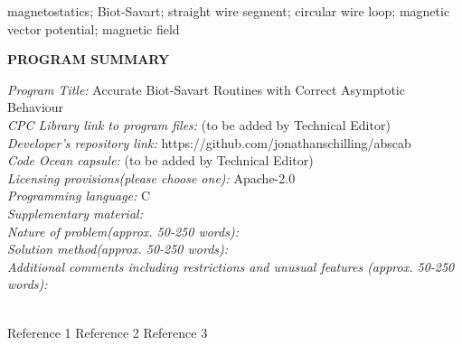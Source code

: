 \documentclass[preprint,12pt]{elsarticle}
\begin{document}
\begin{frontmatter}
\begin{keyword}
magnetostatics; Biot-Savart; straight wire segment; circular wire loop; magnetic vector potential; magnetic field
\end{keyword}

\end{frontmatter}



{\bf PROGRAM SUMMARY}

\begin{small}
\noindent
{\em Program Title:} Accurate Biot-Savart Routines with Correct Asymptotic Behaviour \\
{\em CPC Library link to program files:} (to be added by Technical Editor) \\
{\em Developer's repository link:} https://github.com/jonathanschilling/abscab \\
{\em Code Ocean capsule:} (to be added by Technical Editor)\\
{\em Licensing provisions(please choose one):} Apache-2.0 \\
{\em Programming language:} C                                  \\
{\em Supplementary material:}                                 \\
{\em Nature of problem(approx. 50-250 words):}\\
{\em Solution method(approx. 50-250 words):}\\
{\em Additional comments including restrictions and unusual features (approx. 50-250 words):}\\
   \\

\begin{thebibliography}{0}
Reference 1         %
Reference 2         %
Reference 3         %
\end{thebibliography}
\end{small}
\end{document}

